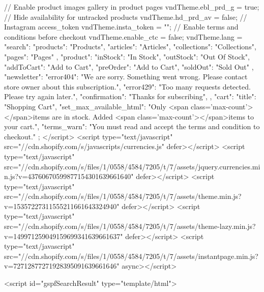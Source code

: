 {{{{{{{// Enable product images gallery in product pages
vndTheme.ebl_prd_g = true;
// Hide availability for untracked products
vndTheme.hd_prd_av = false;
// Instagram access_token
vndTheme.insta_token = "";
// Enable terms and conditions before checkout
vndTheme.enable_ctc = false;
vndTheme.lang = {
  "search": {
    "products":    "Products",
    "articles":    "Articles",
    "collections": "Collections",
    "pages":       "Pages"
  },
  "product": {
    "inStock": "In Stock",
    "outStock": "Out Of Stock",
    "addToCart": "Add to Cart",
    "preOrder": "Add to Cart",
    "soldOut": "Sold Out"
  },
  "newsletter": {
    "error404": "We are sorry. Something went wrong. Please contact store owner about this subscription.",
    "error429": "Too many requests detected. Please try again later.",
    "confirmation": "Thanks for subscribing",
  },
  "cart": {
    "title": "Shopping Cart",
    "set_max_available_html": "Only <span class='max-count'></span>items are in stock. Added <span class='max-count'></span>items to your cart.",
    "terms_warn": "You must read and accept the terms and condition to checkout."
  }
};
</script>
<script type="text/javascript" src="//cdn.shopify.com/s/javascripts/currencies.js" defer></script>
<script type="text/javascript" src="//cdn.shopify.com/s/files/1/0558/4584/7205/t/7/assets/jquery.currencies.min.js?v=43760670599877154301639661640" defer></script>
<script type="text/javascript" src="//cdn.shopify.com/s/files/1/0558/4584/7205/t/7/assets/theme.min.js?v=15357227311555211661643324940" defer></script>
<script type="text/javascript" src="//cdn.shopify.com/s/files/1/0558/4584/7205/t/7/assets/theme-lazy.min.js?v=149971259049159699341639661637" defer></script>
<script type="text/javascript" src="//cdn.shopify.com/s/files/1/0558/4584/7205/t/7/assets/instantpage.min.js?v=72712877271928395091639661646" async></script>


<script id="gspfSearchResult" type="template/html">
{%

{%
{%

{%

{%
{%

{%
    {%
  {%
  {%
  {%
  {%
  {%
{%
  {%
  {%
  {%
  {%
  {%
  {%
{%

}}}}}}}}}}}}}}}}}}}}}}}}}}}}
